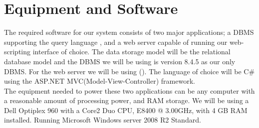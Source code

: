 \section{Equipment and Software}
\label{sec:equipmentsoftware}


The required software for our system consists of two major applications; a DBMS supporting the query language \sql[], and a web server capable of running our web-scripting interface of choice. 
The data storage model will be the relational database model and the DBMS we will be using is \posgresql[] version 8.4.5 as our only DBMS. 
For the web server we will be using  \wholeiis[] (\iis[]). 
The language of choice will be C\# using the ASP.NET MVC(Model-View-Controller) framework. \\


The equipment needed to power these two applications can be any computer with a reasonable amount of processing power, and RAM storage. We will be using a Dell Optiplex 960 with a Core2 Duo CPU, E8400 @ 3.00GHz, with 4 GB RAM installed. Running Microsoft Windows server 2008 R2 Standard.

